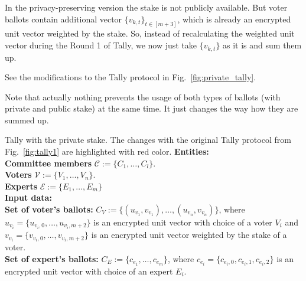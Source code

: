 In the privacy-preserving version the stake is not publicly available. But voter ballots contain additional vector $\{v_{k,t}\}_{t\in[m+3]}$, which is already an encrypted unit vector weighted by the stake. So, instead of recalculating the weighted unit vector during the Round 1 of Tally, we now just take $\{v_{k,t}\}$ as it is and sum them up.

See the modifications to the Tally protocol in Fig.~\ref{fig:private_tally}.

Note that actually nothing prevents the usage of both types of ballots (with private and public stake) at the same time. It just changes the way how they are summed up.

\begin{boxfig}{\label{fig:private_tally}Tally with the private stake. The changes with the original Tally protocol from Fig.~\ref{fig:tally1} are highlighted with red color.}{}
\footnotesize
\textbf{Entities:}\\
    \hspace*{6mm} \textbf{Committee members} $\mathcal{C}:=\{C_1,\ldots, C_l \}$.\\
    \hspace*{6mm} \textbf{Voters} $\mathcal{V}:=\{V_1,\ldots, V_n \}$.\\
    \hspace*{6mm} \textbf{Experts} $\mathcal{E}:=\{E_1,\ldots, E_m \}$\\

\textbf{Input data:}\\
    \hspace*{6mm} {\color{red}\textbf{Set of voter's ballots:} $C_V:=\{(u_{v_1},v_{v_1}),\ldots, (u_{v_n},v_{v_n}) \}$, where $u_{v_i}=\{u_{v_i,0},\ldots,u_{v_i,m+2}\}$ is an encrypted unit vector with choice of a voter $V_i$ and $v_{v_i}=\{v_{v_i,0},\ldots,v_{v_i,m+2}\}$ is an encrypted unit vector weighted by the stake of a voter.}\\
    \hspace*{6mm} \textbf{Set of expert's ballots:} $C_E:=\{c_{e_1},\ldots, c_{e_m} \}$, where $c_{e_i}=\{c_{e_i,0},c_{e_i,1},c_{e_i,2}\}$ is an encrypted unit vector with choice of an expert $E_i$.\\


\end{boxfig}
